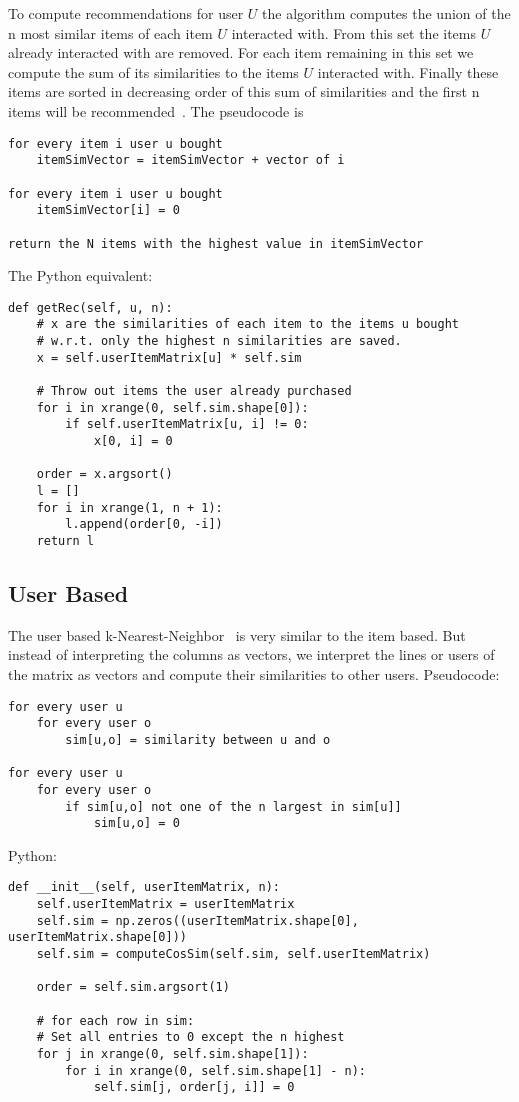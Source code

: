 To compute recommendations for user $U$ the algorithm computes
the union of the n most similar items of each item $U$ interacted with.
From this set the items $U$ already interacted with are removed. For
each item remaining in this set we compute the sum of its similarities
to the items $U$ interacted with. Finally these items are sorted in
decreasing order of this sum of similarities and the first n items
will be recommended~\cite{Karypis:2001:EIT:502585.502627}.
The pseudocode is
\begin{lstlisting}[style=pseudocode]
for every item i user u bought
    itemSimVector = itemSimVector + vector of i

for every item i user u bought
    itemSimVector[i] = 0

return the N items with the highest value in itemSimVector
\end{lstlisting}
The Python equivalent:
\begin{lstlisting}[style=python]
def getRec(self, u, n):
    # x are the similarities of each item to the items u bought
    # w.r.t. only the highest n similarities are saved.
    x = self.userItemMatrix[u] * self.sim

    # Throw out items the user already purchased
    for i in xrange(0, self.sim.shape[0]):
        if self.userItemMatrix[u, i] != 0:
            x[0, i] = 0

    order = x.argsort()
    l = []
    for i in xrange(1, n + 1):
        l.append(order[0, -i])
    return l
\end{lstlisting}



\subsection{User Based}

The user based k-Nearest-Neighbor~\cite{userbasedknn} is very similar to the item based.
But instead of interpreting the columns as vectors, we interpret the
lines or users of the matrix as vectors and compute their similarities
to other users.
Pseudocode:
\begin{lstlisting}[style=pseudocode]
for every user u
    for every user o
        sim[u,o] = similarity between u and o

for every user u
    for every user o
        if sim[u,o] not one of the n largest in sim[u]]
            sim[u,o] = 0
\end{lstlisting}
Python:
\begin{lstlisting}[style=python]
def __init__(self, userItemMatrix, n):
    self.userItemMatrix = userItemMatrix
    self.sim = np.zeros((userItemMatrix.shape[0], userItemMatrix.shape[0]))
    self.sim = computeCosSim(self.sim, self.userItemMatrix)

    order = self.sim.argsort(1)

    # for each row in sim:
    # Set all entries to 0 except the n highest
    for j in xrange(0, self.sim.shape[1]):
        for i in xrange(0, self.sim.shape[1] - n):
            self.sim[j, order[j, i]] = 0
\end{lstlisting}


